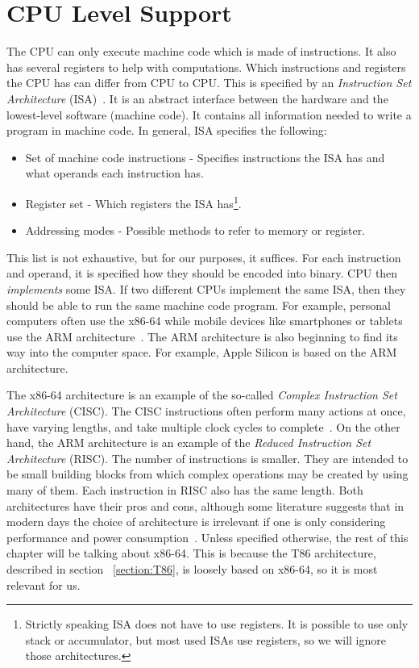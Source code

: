 \section{CPU Level Support}\label{section:cpu-debug-support}
The CPU can only execute machine code which is made of instructions. It also
has several registers to help with computations. Which instructions and
registers the CPU has can differ from CPU to CPU. This is specified by an
\textit{Instruction Set Architecture} (ISA)~\cite{isa}. It is an abstract
interface between the hardware and the lowest-level software (machine code). It
contains all information needed to write a program in machine code. In general,
ISA specifies the following: 
\begin{itemize}
    \item Set of machine code instructions - Specifies instructions the ISA has
        and what operands each instruction has.
    \item Register set - Which registers the ISA has\footnote{Strictly speaking
        ISA does not have to use registers. It is possible to use only stack or
        accumulator, but most used ISAs use registers, so we will ignore those
        architectures. }.   
    \item Addressing modes - Possible methods to refer to memory or register. 
\end{itemize}
This list is not exhaustive, but for our purposes, it suffices. For each
instruction and operand, it is specified how they should be encoded into
binary. CPU then \textit{implements} some ISA. If two different CPUs implement
the same ISA, then they should be able to run the same machine code program.
For example, personal computers often use the x86-64 while mobile devices like
smartphones or tablets use the ARM architecture~\cite{riscvscisc2}. The ARM
architecture is also beginning to find its way into the computer space. For
example, Apple Silicon is based on the ARM architecture.

The x86-64 architecture is an example of the so-called \textit{Complex
Instruction Set Architecture} (CISC). The CISC instructions often perform many
actions at once, have varying lengths, and take multiple clock cycles to
complete~\cite{intel-manual}. On the other hand, the ARM architecture is an
example of the \textit{Reduced Instruction Set Architecture} (RISC). The number
of instructions is smaller. They are intended to be small building blocks from
which complex operations may be created by using many of them. Each instruction
in RISC also has the same length. Both architectures have their pros and cons,
although some literature suggests that in modern days the choice of
architecture is irrelevant if one is only considering performance and power
consumption~\cite{riscvscisc1, riscvscisc2}. Unless specified otherwise, the
rest of this chapter will be talking about x86-64. This is because the T86
architecture, described in section ~\ref{section:T86}, is loosely based on
x86-64, so it is most relevant for us.


